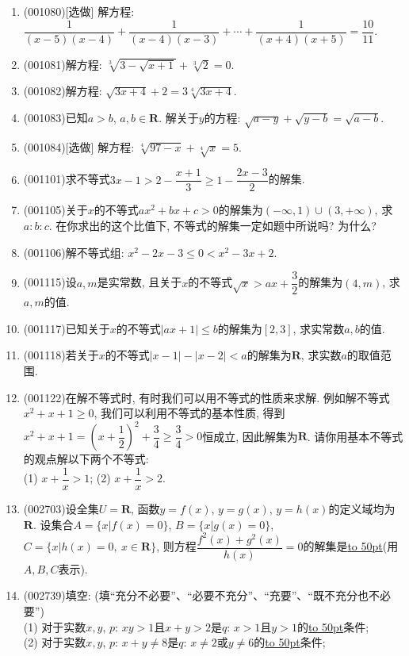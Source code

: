 \documentclass[10pt,a4paper]{article}
\newcommand{\blank}[1]{\underline{\hbox to #1pt{}}}
\begin{document}
\begin{enumerate}[1.]
\item {\tiny (001080)}[选做]
解方程: $\dfrac{1}{(x-5)(x-4)}+\dfrac{1}{(x-4)(x-3)}+\cdots+\dfrac{1}{(x+4)(x+5)}=\dfrac{10}{11}$.
\item {\tiny (001081)}解方程: $\sqrt[3]{3-\sqrt{x+1}}+\sqrt[3]{2}=0$.
\item {\tiny (001082)}解方程: $\sqrt{3x+4}+2=3\sqrt[4]{3x+4}$.
\item {\tiny (001083)}已知$a>b$, $a,b\in \mathbf{R}$. 解关于$y$的方程: $\sqrt{a-y}+\sqrt{y-b}=\sqrt{a-b}$.
\item {\tiny (001084)}[选做]
解方程: $\sqrt[4]{97-x}+\sqrt[4]{x}=5$.
\item {\tiny (001101)}求不等式$3x-1>2-\dfrac{x+1}{3}\ge 1-\dfrac{2x-3}{2}$的解集.
\item {\tiny (001105)}关于$x$的不等式$ax^2+bx+c>0$的解集为$(-\infty,1)\cup (3,+\infty)$, 求$a:b:c$. 在你求出的这个比值下, 不等式的解集一定如题中所说吗? 为什么?
\item {\tiny (001106)}解不等式组: $x^2-2x-3\le 0<x^2-3x+2$.
\item {\tiny (001115)}设$a,m$是实常数, 且关于$x$的不等式$\sqrt{x}>ax+\dfrac{3}{2}$的解集为$(4,m)$, 求$a,m$的值.
\item {\tiny (001117)}已知关于$x$的不等式$|ax+1|\leq b$的解集为$[2,3]$, 求实常数$a,b$的值.
\item {\tiny (001118)}若关于$x$的不等式$|x-1|-|x-2|<a$的解集为$\mathbf{R}$, 求实数$a$的取值范围.
\item {\tiny (001122)}在解不等式时, 有时我们可以用不等式的性质来求解. 例如解不等式$x^2+x+1\ge 0$, 我们可以利用不等式的基本性质, 得到$x^2+x+1=\left(x+\dfrac{1}{2}\right)^2+\dfrac{3}{4}\ge\dfrac{3}{4}>0$恒成立, 因此解集为$\mathbf{R}$. 请你用基本不等式的观点解以下两个不等式:\\ 
(1) $x+\dfrac{1}{x}>1$; \hfill (2) $x+\dfrac{1}{x}>2$. \hfill
\item {\tiny (002703)}设全集$U=\mathbf{R}$, 函数$y=f(x)$, $y=g(x)$, $y=h(x)$的定义域均为$\mathbf{R}$. 设集合$A=\{x|f(x)=0\}$, $B=\{x|g(x)=0\}$, $C=\{x|h(x)=0, \ x\in \mathbf{R}\}$, 则方程$\dfrac{f^2(x)+g^2(x)}{h(x)}=0$的解集是\blank{50}(用$A,B,C$表示).
\item {\tiny (002739)}填空: (填``充分不必要''、``必要不充分''、``充要''、``既不充分也不必要'')\\ 
(1) 对于实数$x,y$, $p$: $xy>1$且$x+y>2$是$q$: $x>1$且$y>1$的\blank{50}条件;\\
(2) 对于实数$x,y$, $p$: $x+y\ne 8$是$q$: $x\ne 2$或$y\ne 6$的\blank{50}条件;\\

\end{enumerate}
\end{document}
